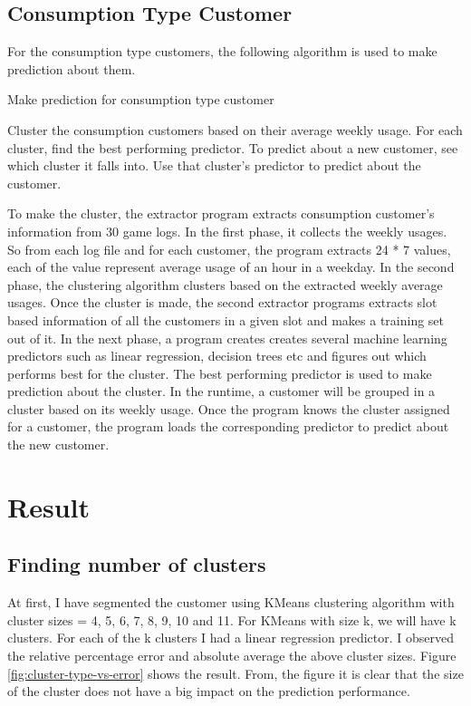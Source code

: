 \subsection{Consumption Type Customer}
For the consumption type customers, the following algorithm is used to make prediction about them.
\begin{algorithm}
\caption{Make prediction for consumption type customer}
\begin{algorithmic} 
\STATE Cluster the consumption customers based on their average weekly usage.
\STATE For each cluster, find the best performing predictor.
\STATE To predict about a new customer, see which cluster it falls into.
\STATE Use that cluster's predictor to predict about the customer.
\end{algorithmic}
\end{algorithm}

To make the cluster, the extractor program extracts consumption customer's information from 30 game logs. In the first phase, it collects the weekly usages. So from each log file and for each customer, the program extracts 24 * 7 values, each of the value represent average usage of an hour in a weekday. In the second phase, the clustering algorithm clusters based on the extracted weekly average usages. Once the cluster is made, the second extractor programs extracts slot based information of all the customers in a given slot and makes a training set out of it. In the next phase, a program creates creates several machine learning predictors such as linear regression, decision trees etc and figures out which performs best for the cluster. The best performing predictor is used to make prediction about the cluster. In the runtime, a customer will be grouped in a cluster based on its weekly usage. Once the program knows the cluster assigned for a customer, the program loads the corresponding predictor to predict about the new customer. 


\section{Result}
\subsection{Finding number of clusters}

At first, I have segmented the customer using KMeans clustering algorithm with cluster sizes = 4, 5, 6, 7, 8, 9, 10 and 11. For KMeans with size k, we will have k clusters. For each of the k clusters I had a linear regression predictor. I observed the relative percentage error and absolute average the above cluster sizes. Figure \ref{fig:cluster-type-vs-error} shows the result. From, the figure it is clear that the size of the cluster does not have a big impact on the prediction performance.

